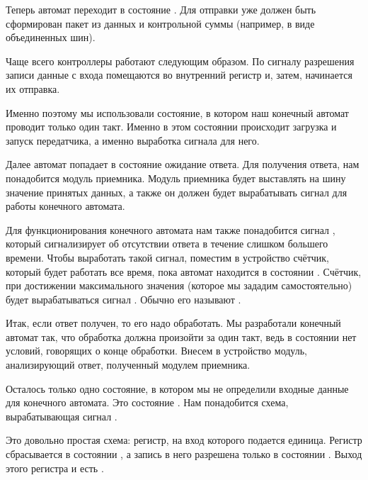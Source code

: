 \par{Теперь автомат переходит в состояние . Для отправки уже должен быть сформирован пакет из данных и контрольной суммы (например, в виде объединенных шин).}

\par{Чаще всего контроллеры работают следующим образом. По сигналу разрешения записи данные с входа помещаются во внутренний регистр и, затем, начинается их отправка.}

\par{Именно поэтому мы использовали состояние, в котором наш конечный автомат проводит только один такт. Именно в этом состоянии происходит загрузка и запуск передатчика, а именно выработка сигнала  для него.}

\par{Далее автомат попадает в состояние ожидание ответа. Для получения ответа, нам понадобится модуль приемника. Модуль приемника будет выставлять на шину значение принятых данных, а также он должен будет вырабатывать сигнал  для работы конечного автомата.}

\par{Для функционирования конечного автомата нам также понадобится сигнал , который сигнализирует об отсутствии ответа в течение слишком большего времени. Чтобы выработать такой сигнал, поместим в устройство счётчик, который будет работать все время, пока автомат находится в состоянии . Счётчик, при достижении максимального значения (которое мы зададим самостоятельно) будет вырабатываться сигнал . Обычно его называют .}

\par{Итак, если ответ получен, то его надо обработать. Мы разработали конечный автомат так, что обработка должна произойти за один такт, ведь в состоянии  нет условий, говорящих о конце обработки. Внесем в устройство модуль, анализирующий ответ, полученный модулем приемника.}

\par{Осталось только одно состояние, в котором мы не определили входные данные для конечного автомата. Это состояние . Нам понадобится схема, вырабатывающая сигнал . }

\par{Это довольно простая схема: регистр, на вход которого подается единица. Регистр сбрасывается в состоянии , а запись в него разрешена только в состоянии . Выход этого регистра и есть .}

